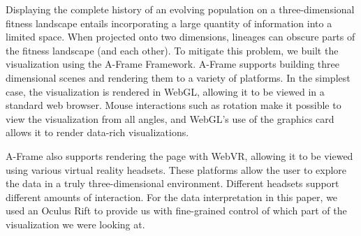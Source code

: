 \documentclass[letterpaper]{article}
\begin{document}


Displaying the complete history of an evolving population on a three-dimensional fitness landscape entails incorporating a large quantity of information into a limited space. When projected onto two dimensions, lineages can obscure parts of the fitness landscape (and each other). To mitigate this problem, we built the visualization using the A-Frame Framework. A-Frame supports building three dimensional scenes and rendering them to a variety of platforms. In the simplest case, the visualization is rendered in WebGL, allowing it to be viewed in a standard web browser. Mouse interactions such as rotation make it possible to view the visualization from all angles, and WebGL's use of the graphics card allows it to render data-rich visualizations. 

A-Frame also supports rendering the page with WebVR, allowing it to be viewed using various virtual reality headsets. These platforms allow the user to explore the data in a truly three-dimensional environment. Different headsets support different amounts of interaction. For the data interpretation in this paper, we used an Oculus Rift to provide us with fine-grained control of which part of the visualization we were looking at.
\end{document}
